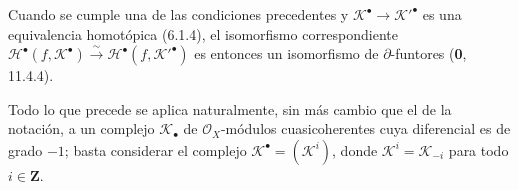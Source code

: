 \begin{env}[6.2.6]
Cuando se cumple una de las condiciones precedentes y
$\mathscr K^\bullet\to\mathscr K'^\bullet$ es una equivalencia homotópica (6.1.4), el
isomorfismo correspondiente
$\mathscr H^\bullet(f,\mathscr K^\bullet)\xrightarrow{\sim}
\mathscr H^\bullet(f,\mathscr K'^\bullet)$ es entonces un isomorfismo de
$\partial$-funtores (\textbf 0, 11.4.4).
\end{env}

\begin{env}[6.2.7]
Todo lo que precede se aplica naturalmente, sin más cambio que el de la
notación, a un complejo $\mathscr K_\bullet$ de $\mathscr O_X$-módulos
cuasicoherentes cuya diferencial es de grado $-1$; basta considerar el
complejo $\mathscr K^\bullet=(\mathscr K^i)$, donde
$\mathscr K^i=\mathscr K_{-i}$ para todo $i\in\mathbf Z$.
\end{env}
